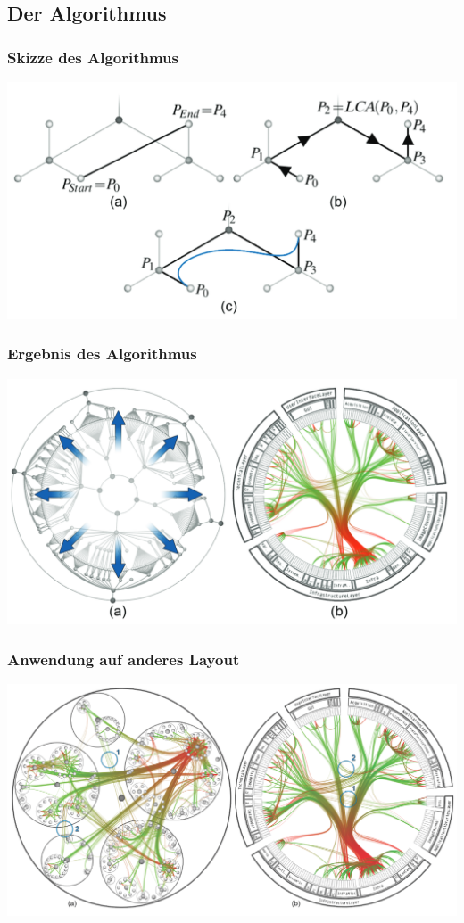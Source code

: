 \documentclass[11pt]{beamer}
\begin{document}
\subsection{Der Algorithmus}
\begin{frame}
\frametitle{Skizze des Algorithmus}
\includegraphics[scale=0.35]{./Algorithm_Scheme.png}
\end{frame}

\begin{frame}
\frametitle{Ergebnis des Algorithmus}
\includegraphics[scale=0.35]{./Algorithm_Result.png}
\end{frame}

\begin{frame}
\frametitle{Anwendung auf anderes Layout}
\includegraphics[scale=0.35]{./Algorithm_Result_OtherLayout.png}
\end{frame}
\end{document}
